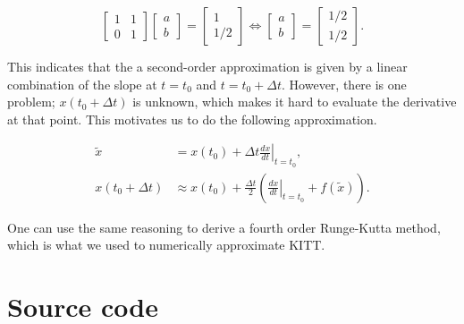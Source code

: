 \documentclass[11pt,titlepage]{report}
\begin{document}
\begin{appendices}
\begin{equation}
\begin{bmatrix}
1 & 1 \\
0 & 1
\end{bmatrix} \begin{bmatrix}
a \\
b
\end{bmatrix} = \begin{bmatrix}
1 \\
1/2
\end{bmatrix} \Leftrightarrow \begin{bmatrix}
a \\
b
\end{bmatrix} = \begin{bmatrix}
1/2 \\
1/2
\end{bmatrix}.
\end{equation}

This indicates that the a second-order approximation is given by a linear combination of the slope at $t=t_0$ and $t=t_0+\Delta t$. However, there is one problem; $x(t_0 + \Delta t)$ is unknown, which makes it hard to evaluate the derivative at that point. This motivates us to do the following approximation.

\begin{align}
\tilde{x} &= x(t_0)+ \Delta t \left. \frac{dx}{dt} \right|_{t=t_0}, \\
x(t_0+\Delta t) &\approx x(t_0) + \frac{\Delta t}{2}\left(\left. \frac{dx}{dt} \right|_{t=t_0} + f(\tilde{x})\right).
\end{align}

One can use the same reasoning to derive a fourth order Runge-Kutta method, which is what we used to numerically approximate KITT.



\chapter{Source code}

\end{appendices}
\end{document}
